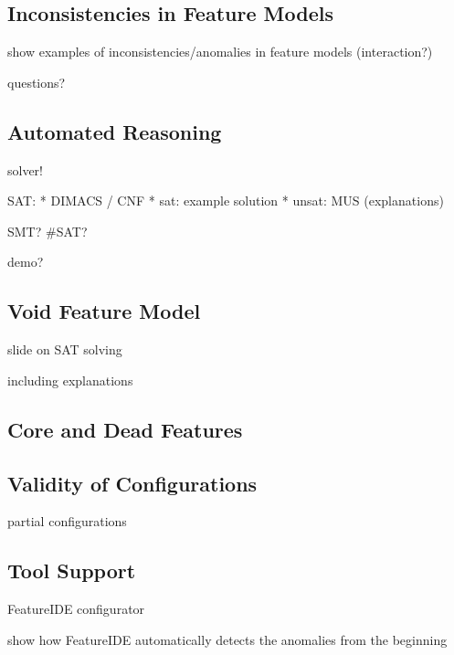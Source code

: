 \subsection{Inconsistencies in Feature Models}

show examples of inconsistencies/anomalies in feature models (interaction?)

questions?

\subsection{Automated Reasoning}

solver!

SAT:
* DIMACS / CNF
* sat: example solution
* unsat: MUS (explanations)

SMT? \#SAT?

demo?

\subsection{Void Feature Model}

slide on SAT solving

including explanations

\subsection{Core and Dead Features}

\subsection{Validity of Configurations}

partial configurations

%
%

\subsection{Tool Support}

FeatureIDE configurator

show how FeatureIDE automatically detects the anomalies from the beginning

%

